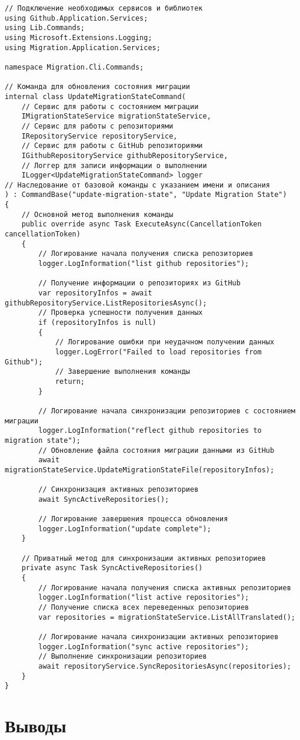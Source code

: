 \begin{lstlisting}[language=c\#,label={lst:update-migration-state-command},caption={Код команды обновления информации о репозиториях}]
// Подключение необходимых сервисов и библиотек
using Github.Application.Services;
using Lib.Commands;
using Microsoft.Extensions.Logging;
using Migration.Application.Services;

namespace Migration.Cli.Commands;

// Команда для обновления состояния миграции
internal class UpdateMigrationStateCommand(
    // Сервис для работы с состоянием миграции
    IMigrationStateService migrationStateService,
    // Сервис для работы с репозиториями
    IRepositoryService repositoryService,
    // Сервис для работы с GitHub репозиториями
    IGithubRepositoryService githubRepositoryService,
    // Логгер для записи информации о выполнении
    ILogger<UpdateMigrationStateCommand> logger
// Наследование от базовой команды с указанием имени и описания
) : CommandBase("update-migration-state", "Update Migration State")
{
    // Основной метод выполнения команды
    public override async Task ExecuteAsync(CancellationToken cancellationToken)
    {
        // Логирование начала получения списка репозиториев
        logger.LogInformation("list github repositories");

        // Получение информации о репозиториях из GitHub
        var repositoryInfos = await githubRepositoryService.ListRepositoriesAsync();
        // Проверка успешности получения данных
        if (repositoryInfos is null)
        {
            // Логирование ошибки при неудачном получении данных
            logger.LogError("Failed to load repositories from Github");
            // Завершение выполнения команды
            return;
        }

        // Логирование начала синхронизации репозиториев с состоянием миграции
        logger.LogInformation("reflect github repositories to migration state");
        // Обновление файла состояния миграции данными из GitHub
        await migrationStateService.UpdateMigrationStateFile(repositoryInfos);

        // Синхронизация активных репозиториев
        await SyncActiveRepositories();

        // Логирование завершения процесса обновления
        logger.LogInformation("update complete");
    }

    // Приватный метод для синхронизации активных репозиториев
    private async Task SyncActiveRepositories()
    {
        // Логирование начала получения списка активных репозиториев
        logger.LogInformation("list active repositories");
        // Получение списка всех переведенных репозиториев
        var repositories = migrationStateService.ListAllTranslated();

        // Логирование начала синхронизации активных репозиториев
        logger.LogInformation("sync active repositories");
        // Выполнение синхронизации репозиториев
        await repositoryService.SyncRepositoriesAsync(repositories);
    }
}
\end{lstlisting}

\section{Выводы} \label{sec:conclusion}
